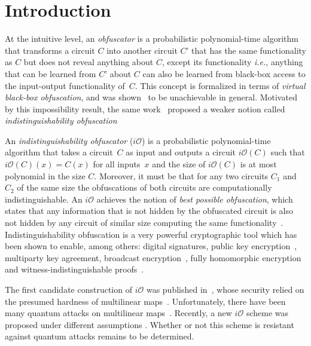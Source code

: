 \section{Introduction}
At the intuitive level, an \emph{obfuscator} is a probabilistic polynomial-time algorithm that  transforms a circuit $C$ into another circuit $C’$ that has the same functionality as $C$ but does not reveal anything about $C$, except its functionality \emph{i.e.}, anything that can be learned from $C’$ about $C$ can also be learned from  black-box access to the input-output functionality of~$C$. This concept is formalized in terms of \emph{virtual black-box obfuscation}, and was shown~\cite{BGI+12} to be unachievable in general.
Motivated by this impossibility result, the same work~\cite{BGI+12} proposed a weaker notion called \emph{indistinguishability obfuscation} 

An \emph{indistinguishability obfuscator} ($i\mathcal{O}$) is a probabilistic polynomial-time algorithm that takes a circuit~$C$ as  input and outputs a circuit $i\mathcal{O}(C)$ such that $i\mathcal{O}(C)(x)=C(x)$ for all inputs~$x$ and the size of $i\mathcal{O}(C)$ is at most polynomial in the size $C$. Moreover, it must be that for any two circuits $C_1$ and $C_2$ of the same size  the obfuscations of both circuits are computationally indistinguishable. An $i\mathcal{O}$ achieves the notion of \emph{best possible obfuscation}, which states that any information that is not hidden by the obfuscated circuit is also not hidden by any  circuit of similar size computing the same functionality~\cite{GR14}. Indistinguishability obfuscation is a very powerful cryptographic tool which has been shown to enable, among others: digital signatures, public key encryption~\cite{SW14}, multiparty key agreement, broadcast encryption~\cite{BZ14}, fully homomorphic encryption~\cite{CLTV15} and witness-indistinguishable proofs~\cite{BP15}.

The first candidate construction of $i\mathcal{O}$ was published in~\cite{GGH+13}, whose security relied on the presumed hardness of multilinear maps~\cite{CLT13, LSS14, GGH15}. Unfortunately, there have been many quantum attacks on  multilinear maps~\cite{ABD16, CDPR16, CGH17}.  Recently, a new $i\mathcal{O}$ scheme was proposed under  different assumptions \cite{AJL+19}. Whether or not this scheme is resistant against quantum attacks remains to be determined.

